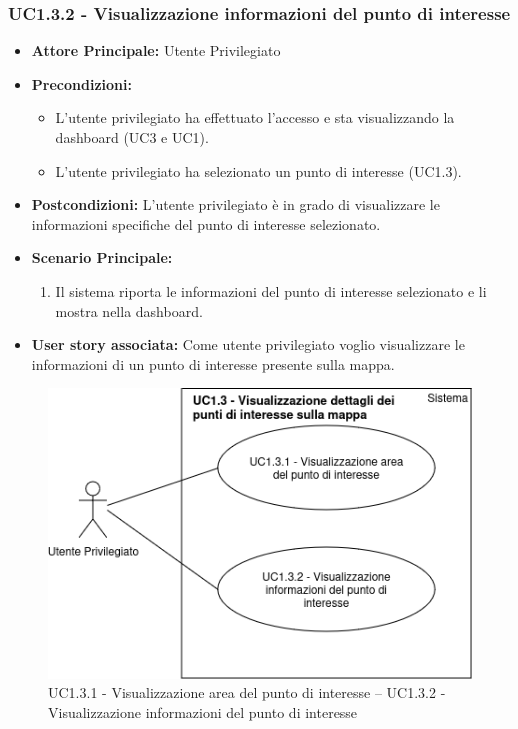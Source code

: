 \documentclass[11pt]{article}
\begin{document}
\begin{justify}
 \subsubsection{\textbf{UC1.3.2 - Visualizzazione informazioni del punto di interesse}}
 \begin{itemize}
     \item \textbf{Attore Principale:} Utente Privilegiato
     \item \textbf{Precondizioni:}
       \begin{itemize}
            \item L'utente privilegiato ha effettuato l'accesso e sta visualizzando la dashboard (UC3 e UC1).
            \item L'utente privilegiato ha selezionato un punto di interesse (UC1.3).
       \end{itemize}
     \item \textbf{Postcondizioni:} L'utente privilegiato è in grado di visualizzare le informazioni specifiche del punto di interesse selezionato.
     \item \textbf{Scenario Principale:}
        \begin{enumerate}
            \item Il sistema riporta le informazioni del punto di interesse selezionato e li mostra nella dashboard.
        \end{enumerate}
     \item \textbf{User story associata:} Come utente privilegiato voglio visualizzare le informazioni di un punto di interesse presente sulla mappa. 
 \end{itemize}
\begin{figure}[ht]
    \centering
    \includegraphics[width=0.5\linewidth]{UC1.3.1-UC1.3.2image.png}
    \caption{UC1.3.1 - Visualizzazione area del punto di interesse -- UC1.3.2 - Visualizzazione informazioni del punto di interesse}
    \label{fig:UC1.3.1-UC1.3.2}
\end{figure}

\end{justify}
\end{document}
